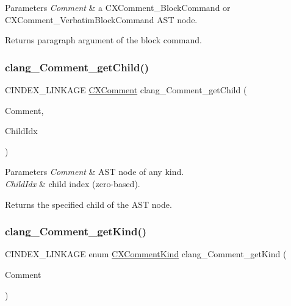 \begin{DoxyParams}{Parameters}
{\em Comment} & a {\ttfamily C\+X\+Comment\+\_\+\+Block\+Command} or {\ttfamily C\+X\+Comment\+\_\+\+Verbatim\+Block\+Command} A\+ST node.\\
\hline
\end{DoxyParams}
\begin{DoxyReturn}{Returns}
paragraph argument of the block command. 
\end{DoxyReturn}
\mbox{\label{group__CINDEX__COMMENT_gad5567ecc26b083562e42b83170c105aa}} 
\subsubsection{\texorpdfstring{clang\+\_\+\+Comment\+\_\+get\+Child()}{clang\_Comment\_getChild()}}
{\footnotesize\ttfamily C\+I\+N\+D\+E\+X\+\_\+\+L\+I\+N\+K\+A\+GE \mbox{\hyperlink{structCXComment}{C\+X\+Comment}} clang\+\_\+\+Comment\+\_\+get\+Child (\begin{DoxyParamCaption}\item[{\mbox{\hyperlink{structCXComment}{C\+X\+Comment}}}]{Comment,  }\item[{unsigned}]{Child\+Idx }\end{DoxyParamCaption})}


\begin{DoxyParams}{Parameters}
{\em Comment} & A\+ST node of any kind.\\
\hline
{\em Child\+Idx} & child index (zero-\/based).\\
\hline
\end{DoxyParams}
\begin{DoxyReturn}{Returns}
the specified child of the A\+ST node. 
\end{DoxyReturn}
\mbox{\label{group__CINDEX__COMMENT_gad7f2a27ab2f69abcb9442e05a21a130f}} 
\subsubsection{\texorpdfstring{clang\+\_\+\+Comment\+\_\+get\+Kind()}{clang\_Comment\_getKind()}}
{\footnotesize\ttfamily C\+I\+N\+D\+E\+X\+\_\+\+L\+I\+N\+K\+A\+GE enum \mbox{\hyperlink{group__CINDEX__COMMENT_ga3c336d80551401fde394b84aa5651221}{C\+X\+Comment\+Kind}} clang\+\_\+\+Comment\+\_\+get\+Kind (\begin{DoxyParamCaption}\item[{\mbox{\hyperlink{structCXComment}{C\+X\+Comment}}}]{Comment }\end{DoxyParamCaption})}


